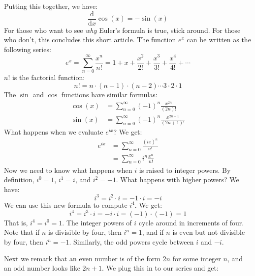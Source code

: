 \documentclass{article}
\begin{document}
    Putting this together, we have:
    \begin{equation}
        \frac{\text{d}}{\text{d}x}\cos(x)=-\sin(x)
    \end{equation}
    For those who want to see \textit{why} Euler's formula is true, stick
    around. For those who don't, this concludes this short article.
    The function $e^{x}$ can be written as the following series:
    \begin{equation}
        e^{x}=\sum_{n=0}^{\infty}\frac{x^{n}}{n!}=1+x+\frac{x^{2}}{2!}
            +\frac{x^{3}}{3!}+\frac{x^{4}}{4!}+\cdots
    \end{equation}
    $n!$ is the factorial function:
    \begin{equation}
        n!=n\cdot(n-1)\cdot(n-2)\cdots{3}\cdot{2}\cdot{1}
    \end{equation}
    The $\sin$ and $\cos$ functions have similar formulas:
    \begin{align}
        \cos(x)&=\sum_{n=0}^{\infty}(-1)^{n}\frac{x^{2n}}{(2n)!}\\
        \sin(x)&=\sum_{n=0}^{\infty}(-1)^{n}\frac{x^{2n+1}}{(2n+1)!}
    \end{align}
    What happens when we evaluate $e^{ix}$? We get:
    \begin{align}
        e^{ix}&=\sum_{n=0}^{\infty}\frac{(ix)^{n}}{n!}\\
            &=\sum_{n=0}^{\infty}i^{n}\frac{x^{n}}{n!}
    \end{align}
    Now we need to know what happens when $i$ is raised to integer powers.
    By definition, $i^{0}=1$, $i^{1}=i$, and $i^{2}=-1$. What happens with
    higher powers? We have:
    \begin{equation}
        i^{3}=i^{2}\cdot{i}=-1\cdot{i}=-i
    \end{equation}
    We can use this new formula to compute $i^{4}$. We get:
    \begin{equation}
        i^{4}=i^{3}\cdot{i}=-i\cdot{i}=(-1)\cdot(-1)=1
    \end{equation}
    That is, $i^{4}=i^{0}=1$. The integer powers of $i$ cycle around in
    increments of four. Note that if $n$ is divisible by four, then
    $i^{n}=1$, and if $n$ is even but not divisible by four, then
    $i^{n}=-1$. Similarly, the odd powers cycle between $i$ and $-i$.
    \par\hfill\par
    Next we remark that an even number is of the form $2n$ for some integer $n$,
    and an odd number looks like $2n+1$. We plug this in to our series and get:
\end{document}
